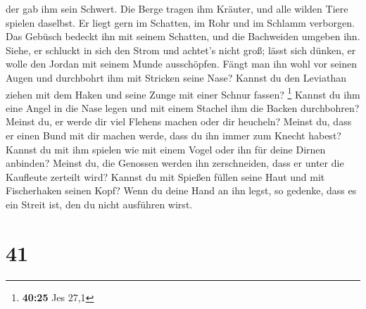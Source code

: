 der gab ihm sein Schwert.  Die Berge tragen ihm Kräuter,
und alle wilden Tiere spielen daselbst.  Er liegt gern im
Schatten, im Rohr und im Schlamm verborgen.  Das Gebüsch
bedeckt ihn mit seinem Schatten, und die Bachweiden umgeben ihn.
 Siehe, er schluckt in sich den Strom und achtet's nicht
groß; lässt sich dünken, er wolle den Jordan mit seinem Munde
ausschöpfen.  Fängt man ihn wohl vor seinen Augen und
durchbohrt ihm mit Stricken seine Nase?  Kannst du den
Leviathan ziehen mit dem Haken und seine Zunge mit einer Schnur fassen?
\footnote{\textbf{40:25} Jes 27,1}  Kannst du ihm eine
Angel in die Nase legen und mit einem Stachel ihm die Backen
durchbohren?  Meinst du, er werde dir viel Flehens machen
oder dir heucheln?  Meinst du, dass er einen Bund mit dir
machen werde, dass du ihn immer zum Knecht habest? 
Kannst du mit ihm spielen wie mit einem Vogel oder ihn für deine Dirnen
anbinden?  Meinst du, die Genossen werden ihn
zerschneiden, dass er unter die Kaufleute zerteilt wird? 
Kannst du mit Spießen füllen seine Haut und mit Fischerhaken seinen
Kopf?  Wenn du deine Hand an ihn legst, so gedenke, dass
es ein Streit ist, den du nicht ausführen wirst.

\hypertarget{section-40}{%
\section{41}\label{section-40}}

